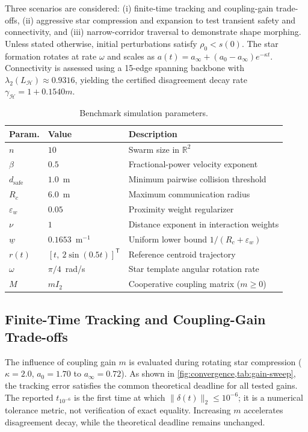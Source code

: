 \documentclass[letterpaper,10pt,conference]{ieeeconf}
\newcommand{\R}{\mathbb{R}}
\newcommand{\trans}{^{\mathsf T}}
\newcommand{\dsafe}{d_{\mathrm{safe}}}
\newcommand{\Rc}{R_c}
\newcommand{\epsw}{\varepsilon_w}
\newcommand{\gamH}{\gamma_{\mathcal H}}
\begin{document}
Three scenarios are considered: (i) finite-time tracking and coupling-gain trade-offs, (ii) aggressive star compression and expansion to test transient safety and connectivity, and (iii) narrow-corridor traversal to demonstrate shape morphing. Unless stated otherwise, initial perturbations satisfy $\rho_0<s(0)$. The star formation rotates at rate $\omega$ and scales as $a(t)=a_\infty+(a_0-a_\infty)e^{-\kappa t}$. Connectivity is assessed using a 15-edge spanning backbone with $\lambda_2(L_{\mathcal H})\approx0.9316$, yielding the certified disagreement decay rate $\gamH=1+0.1540m$.

\begin{table}[t]
\centering
\caption{Benchmark simulation parameters.}
\label{tab:sim-parameters}
\footnotesize
\begin{tabularx}{\columnwidth}{llX}
\toprule
Param. & Value & Description \\
\midrule
$n$ & $10$ & Swarm size in $\R^2$ \\
$\beta$ & $0.5$ & Fractional-power velocity exponent \\
$\dsafe$ & $1.0$~m & Minimum pairwise collision threshold \\
$\Rc$ & $6.0$~m & Maximum communication radius \\
$\epsw$ & $0.05$ & Proximity weight regularizer \\
$\nu$ & $1$ & Distance exponent in interaction weights \\
$\underline{w}$ & $0.1653$~m$^{-1}$ & Uniform lower bound $1/(\Rc + \epsw)$ \\
$r(t)$ & $[t,\ 2\sin(0.5t)]\trans$ & Reference centroid trajectory \\
$\omega$ & $\pi/4$~rad/s & Star template angular rotation rate \\
$M$ & $m I_2$ & Cooperative coupling matrix ($m \ge 0$) \\
\bottomrule
\end{tabularx}
\end{table}

\subsection{Finite-Time Tracking and Coupling-Gain Trade-offs}

The influence of coupling gain $m$ is evaluated during rotating star compression ($\kappa=2.0$, $a_0=1.70$ to $a_\infty=0.72$). As shown in \cref{fig:convergence,tab:gain-sweep}, the tracking error satisfies the common theoretical deadline for all tested gains. The reported $t_{10^{-6}}$ is the first time at which $\|\delta(t)\|_2\leq10^{-6}$; it is a numerical tolerance metric, not verification of exact equality. Increasing $m$ accelerates disagreement decay, while the theoretical deadline remains unchanged.
\end{document}
